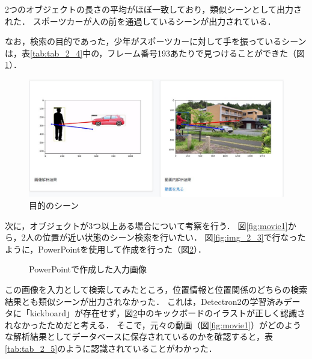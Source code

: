 \documentclass[a4j,12pt,dvipdfmx]{jreport}
\begin{document}
2つのオブジェクトの長さの平均がほぼ一致しており，類似シーンとして出力された．
スポーツカーが人の前を通過しているシーンが出力されている．

なお，検索の目的であった，少年がスポーツカーに対して手を振っているシーンは，表\ref{tab:tab_2_4}中の，フレーム番号193あたりで見つけることができた（図\ref{fig:img_2_3_3}）．
\begin{figure}[t]
  \centering
  \includegraphics[width=13cm]{image/result_2_3_3.jpg}
  \caption{目的のシーン}
  \label{fig:img_2_3_3}
\end{figure}

次に，オブジェクトが3つ以上ある場合について考察を行う．
図\ref{fig:movie1}から，2人の位置が近い状態のシーン検索を行いたい．
図\ref{fig:img_2_3}で行なったように，PowerPointを使用して作成を行った（図\ref{fig:img_2_4}）．

\begin{figure}[h]
  \centering
  \caption{PowerPointで作成した入力画像}
  \label{fig:img_2_4}
\end{figure}


この画像を入力として検索してみたところ，位置情報と位置関係のどちらの検索結果とも類似シーンが出力されなかった．
これは，Detectron2の学習済みデータに「kickboard」が存在せず，図\ref{fig:img_2_4}中のキックボードのイラストが正しく認識されなかったためだと考える．
そこで，元々の動画（図\ref{fig:movie1}）がどのような解析結果としてデータベースに保存されているのかを確認すると，表\ref{tab:tab_2_5}のように認識されていることがわかった．
\end{document}
